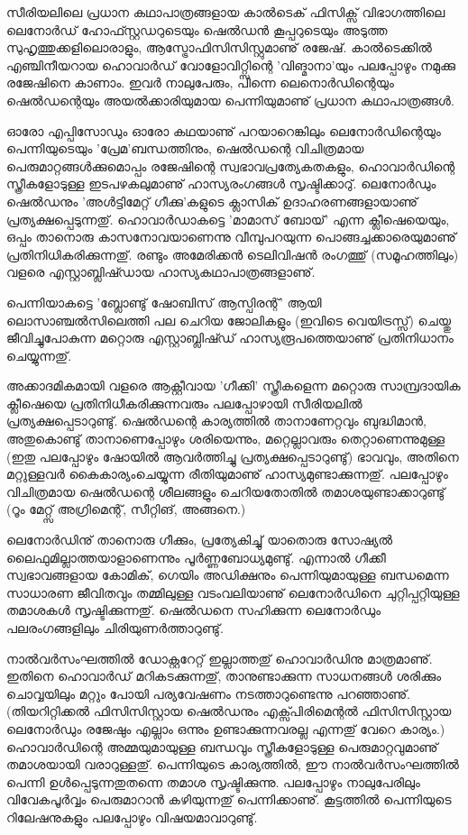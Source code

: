 സീരിയലിലെ പ്രധാന കഥാപാത്രങ്ങളായ കാല്‍ടെക് ഫിസിക്സ് വിഭാഗത്തിലെ ലെനോര്‍ഡ് ഹോഫ്സ്റ്റഡറുടെയും ഷെല്‍ഡന്‍ 
കൂപ്പറുടെയും അടുത്ത സുഹൃത്തുക്കളിലൊരാളും, ആസ്ട്രോഫിസിസിസ്റ്റുമാണു് രജേഷ്. കാല്‍ടെക്കില്‍ എഞ്ചിനീയറായ
 ഹൊവാര്‍ഡ് വോളോവിറ്റ്സിന്റെ 'വിങ്മാനാ'യും പലപ്പോഴും നമുക്കു രജേഷിനെ കാണാം. ഇവര്‍ നാലുപേരും, പിന്നെ 
 ലെനൊര്‍ഡിന്റെയും ഷെല്‍ഡന്റെയും അയല്‍ക്കാരിയുമായ പെന്നിയുമാണു് പ്രധാന കഥാപാത്രങ്ങള്‍.

ഓരോ എപ്പിസോഡും ഓരോ കഥയാണു് പറയാറെങ്കിലും ലെനോര്‍ഡിന്റെയും പെന്നിയുടെയും 'പ്രേമ'ബന്ധത്തിനും, ഷെല്‍ഡന്റെ 
വിചിത്രമായ പെരുമാറ്റങ്ങള്‍ക്കുമൊപ്പം രജേഷിന്റെ സ്വഭാവപ്രത്യേകതകളും, ഹൊവാര്‍ഡിന്റെ സ്ത്രീകളോടുള്ള ഇടപഴകലുമാണു് 
ഹാസ്യരംഗങ്ങള്‍ സൃഷ്ടിക്കാറു്. ലെനോര്‍ഡും ഷെല്‍ഡനും 'അള്‍ട്ടിമേറ്റ് ഗീക്കു'കളുടെ ക്ലാസിക് ഉദാഹരണങ്ങളായാണു് 
പ്രത്യക്ഷപ്പെടുന്നതു്. ഹൊവാര്‍ഡാകട്ടെ 'മാമാസ് ബോയ്' എന്ന ക്ലീഷെയെയും, ഒപ്പം താനൊരു കാസനോവയാണെന്നു 
വീമ്പുപറയുന്ന പൊങ്ങച്ചക്കാരെയുമാണു് പ്രതിനിധികരിക്കുന്നതു്. രണ്ടും അമേരിക്കന്‍ ടെലിവിഷന്‍ രംഗത്തു് (സമൂഹത്തിലും)
 വളരെ എസ്റ്റാബ്ലിഷ്ഡായ ഹാസ്യകഥാപാത്രങ്ങളാണു്.

പെന്നിയാകട്ടെ 'ബ്ലോണ്ടു് ഷോബിസ് ആസ്പിരന്റ്' ആയി ലൊസാഞ്ചല്‍സിലെത്തി പല ചെറിയ ജോലികളും (ഇവിടെ വെയിട്രസ്സ്)
 ചെയ്തു ജീവിച്ചുപോകുന്ന മറ്റൊരു എസ്റ്റാബ്ലിഷ്ഡ് ഹാസ്യരൂപത്തെയാണു് പ്രതിനിധാനം ചെയ്യുന്നതു്.

അക്കാദമികമായി വളരെ ആക്റ്റീവായ 'ഗീക്കി' സ്ത്രീകളെന്ന മറ്റൊരു സാമ്പ്രദായിക ക്ലീഷെയെ പ്രതിനിധീകരിക്കുന്നവരും 
പലപ്പോഴായി സീരിയലില്‍ പ്രത്യക്ഷപ്പെടാറുണ്ടു്. ഷെല്‍ഡന്റെ കാര്യത്തില്‍ താനാണേറ്റവും ബുദ്ധിമാന്‍, അതുകൊണ്ടു് 
താനാണെപ്പോഴും ശരിയെന്നും, മറ്റെല്ലാവരും തെറ്റാണെന്നുമുള്ള (ഇതു പലപ്പോഴും ഷോയില്‍ ആവര്‍ത്തിച്ചു പ്രത്യക്ഷപ്പെടാറുണ്ടു്) 
ഭാവവും, അതിനെ മറ്റുള്ളവര്‍ കൈകാര്യംചെയ്യുന്ന രീതിയുമാണു് ഹാസ്യമുണ്ടാക്കുന്നതു്. പലപ്പോഴും വിചിത്രമായ ഷെല്‍ഡന്റെ 
ശീലങ്ങളും ചെറിയതോതില്‍ തമാശയുണ്ടാക്കാറുണ്ടു് (റൂം മേറ്റ്സ് അഗ്രിമെന്റ്, സീറ്റിങ്, അങ്ങനെ.)

ലെനോര്‍ഡിനു് താനൊരു ഗീക്കും, പ്രത്യേകിച്ചു് യാതൊരു സോഷ്യല്‍ ലൈഫുമില്ലാത്തയാളാണെന്നും പൂര്‍ണ്ണബോധ്യമുണ്ടു്. 
എന്നാല്‍ ഗീക്കീ സ്വഭാവങ്ങളായ കോമിക്, ഗെയിം അഡിക്ഷനും പെന്നിയുമായുള്ള ബന്ധമെന്ന സാധാരണ ജീവിതവും തമ്മിലുള്ള
 വടംവലിയാണു് ലെനോര്‍ഡിനെ ചുറ്റിപ്പറ്റിയുള്ള തമാശകള്‍ സൃഷ്ടിക്കുന്നതു്. ഷെല്‍ഡനെ സഹിക്കുന്ന ലെനോര്‍ഡും പലരംഗങ്ങളിലും
  ചിരിയുണര്‍ത്താറുണ്ടു്.

നാല്‍വര്‍സംഘത്തില്‍ ഡോക്റ്ററേറ്റ് ഇല്ലാത്തതു് ഹൊവാര്‍ഡിനു മാത്രമാണു്. ഇതിനെ ഹൊവാര്‍ഡ് മറികടക്കുന്നതു്, 
താനുണ്ടാക്കുന്ന സാധനങ്ങള്‍ ശരിക്കും ചൊവ്വയിലും മറ്റും പോയി പര്യവേഷണം നടത്താറുണ്ടെന്നു പറഞ്ഞാണു്. (തിയറിറ്റിക്കല്‍ 
ഫിസിസിസ്റ്റായ ഷെല്‍ഡനും എക്സ്പിരിമെന്റല്‍ ഫിസിസിസ്റ്റായ ലെനോര്‍ഡും രജേഷും എല്ലാം ഒന്നും ഉണ്ടാക്കുന്നവരല്ല എന്നതു്
 വേറെ കാര്യം.) ഹൊവാര്‍ഡിന്റെ അമ്മയുമായുള്ള ബന്ധവും സ്ത്രീകളോടുള്ള പെരുമാറ്റവുമാണു് തമാശയായി വരാറുള്ളതു്. 
 പെന്നിയുടെ കാര്യത്തില്‍, ഈ നാല്‍വര്‍സംഘത്തില്‍ പെന്നി ഉള്‍പ്പെടുന്നതുതന്നെ തമാശ സൃഷ്ടിക്കുന്നു. പലപ്പോഴും നാലുപേരിലും
  വിവേകപൂര്‍വ്വം പെരുമാറാന്‍ കഴിയുന്നതു് പെന്നിക്കാണു്. കൂട്ടത്തില്‍ പെന്നിയുടെ റിലേഷനുകളും പലപ്പോഴും വിഷയമാവാറുണ്ടു്.

